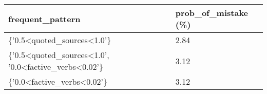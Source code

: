 \begin{tabular}{|l|l|}
\hline
\textbf{frequent\_pattern}                                                                         & \textbf{prob\_of\_mistake (\%)} \\ \hline
\{'0.5\textless{}quoted\_sources\textless{}1.0'\}                                                  & 2.84                            \\ \hline
\{'0.5\textless{}quoted\_sources\textless{}1.0',   '0.0\textless{}factive\_verbs\textless{}0.02'\} & 3.12                            \\ \hline
\{'0.0\textless{}factive\_verbs\textless{}0.02'\}                                                  & 3.12                            \\ \hline
\end{tabular}